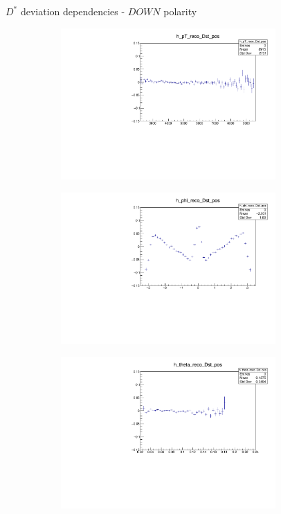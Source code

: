 \documentclass[11pt]{beamer}
\begin{document}
\begin{frame}{$D^*$ deviation dependencies - $DOWN$ polarity}
\begin{figure}
\begin{subfigure}{0.45\textwidth}
\includegraphics[width=0.9\textwidth]{down_pdf/deviation/h_pt_reco_Dst_pos.pdf}
\end{subfigure}
\begin{subfigure}{0.45\textwidth}
\includegraphics[width=0.9\textwidth]{down_pdf/deviation/h_phi_reco_Dst_pos.pdf}
\end{subfigure}
\begin{subfigure}{0.45\textwidth}
\includegraphics[width=0.9\textwidth]{down_pdf/deviation/h_theta_reco_Dst_pos.pdf}

\end{subfigure}
\end{figure}
\end{frame}
\end{document}
